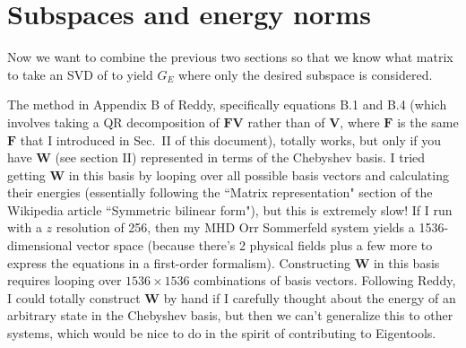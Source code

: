 \documentclass[aps,pop,preprint]{revtex4}
\begin{document}
\section{Subspaces and energy norms}
Now we want to combine the previous two sections so that we know what matrix to take an SVD of to yield $G_E$ where only the desired subspace is considered. 

The method in Appendix B of Reddy, specifically equations B.1 and B.4 (which involves taking a QR decomposition of $\mathbf{FV}$ rather than of $\mathbf{V}$, where $\mathbf{F}$ is the same $\mathbf{F}$ that I introduced in Sec.~II of this document), totally works, but only if you have $\mathbf{W}$ (see section II) represented in terms of the Chebyshev basis. 
I tried getting $\mathbf{W}$ in this basis by looping over all possible basis vectors and calculating their energies (essentially following the ``Matrix representation" section of the Wikipedia article ``Symmetric bilinear form"), but this is extremely slow! 
If I run with a $z$ resolution of 256, then my MHD Orr Sommerfeld system yields a 1536-dimensional vector space (because there's 2 physical fields plus a few more to express the equations in a first-order formalism). 
Constructing $\mathbf{W}$ in this basis requires looping over $1536 \times 1536$ combinations of basis vectors. 
Following Reddy, I could totally construct $\mathbf{W}$ by hand if I carefully thought about the energy of an arbitrary state in the Chebyshev basis, but then we can't generalize this to other systems, which would be nice to do in the spirit of contributing to Eigentools. 
\end{document}
